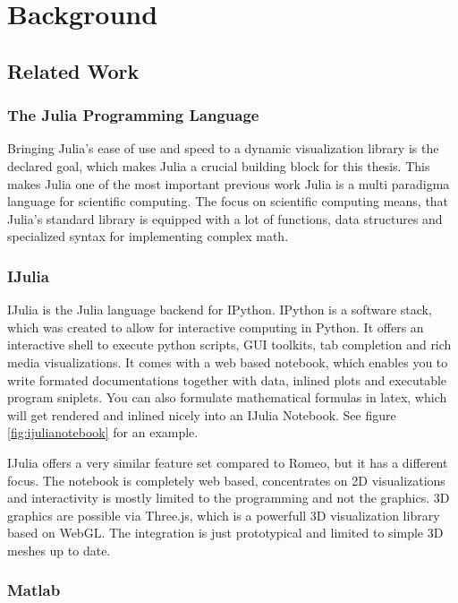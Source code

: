 \section{Background}


\subsection{Related Work}


\subsubsection{The Julia Programming Language}
Bringing Julia's ease of use and speed to a dynamic visualization library is the declared goal, which makes Julia a crucial building block for this thesis.
This makes Julia one of the most important previous work
Julia is a multi paradigma language for scientific computing.
The focus on scientific computing means, that Julia's standard library is equipped with a lot of functions, data structures and specialized syntax for implementing complex math.


\subsubsection{IJulia}
IJulia is the Julia language backend for IPython.
IPython is a software stack, which was created to allow for interactive computing in Python.
It offers an interactive shell to execute python scripts, \ac{GUI} toolkits, tab completion and rich media visualizations.
It comes with a web based notebook, which enables you to write formated documentations together with data, inlined plots and executable program sniplets. You can also formulate mathematical formulas in latex, which will get rendered and inlined nicely into an IJulia Notebook.
See figure \ref{fig:ijulianotebook} for an example.

IJulia offers a very similar feature set compared to Romeo, but it has a different focus.
The notebook is completely web based, concentrates on 2D visualizations and interactivity is mostly limited to the programming and not the graphics.
3D graphics are possible via Three.js, which is a powerfull 3D visualization library based on WebGL.
The integration is just prototypical and limited to simple 3D meshes up to date.


\subsubsection{Matlab}

